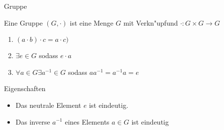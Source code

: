 \documentclass[class=article, crop=false]{standalone}
\begin{document}
\begin{zettel}{Gruppe}
\begin{flashcard}[]{}

	\begin{definition}[Gruppe]
		Eine Gruppe $(G, \cdot )$ ist eine Menge $G$ mit Verkn"upfund $\cdot : G \times G \longrightarrow G$
		\begin{enumerate}
			\item $(a \cdot b) \cdot c =  a \cdot c) $
			\item $\exists e \in  G$  sodass $e \cdot  a $
			\item $\forall a \in  G \exists a^{-1} \in  G$  sodass $aa^{-1} =  a^{-1} a = e$
		\end{enumerate}

	\end{definition}
\end{flashcard}
\begin{remark}
	Eigenschaften
	\begin{itemize}
		\item Das neutrale Element $e$ ist eindeutig.
		\item Das inverse $a^{-1} $ eines Elements $a \in  G$ ist eindeutig
	\end{itemize}
\end{remark}
\end{zettel}
\end{document}
